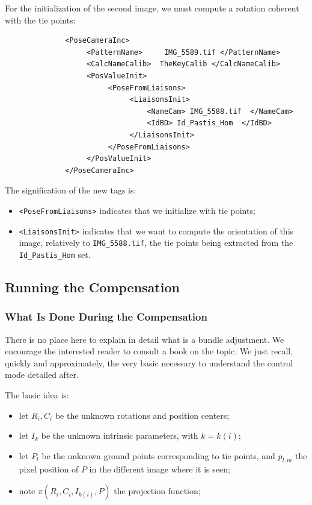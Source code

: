 For the initialization of the second image, we must compute
a rotation coherent with the tie points:


{\scriptsize
\begin{verbatim}
              <PoseCameraInc>
                   <PatternName>     IMG_5589.tif </PatternName>
                   <CalcNameCalib>  TheKeyCalib </CalcNameCalib>
                   <PosValueInit>
                        <PoseFromLiaisons>
                             <LiaisonsInit>
                                 <NameCam> IMG_5588.tif  </NameCam>
                                 <IdBD> Id_Pastis_Hom  </IdBD>
                             </LiaisonsInit>
                        </PoseFromLiaisons>
                   </PosValueInit>
              </PoseCameraInc>
\end{verbatim}
}

The signification of the new tags is:

\begin{itemize}
   \item {\tt <PoseFromLiaisons>} indicates that we initialize with tie points;
   \item {\tt <LiaisonsInit>} indicates that we want to compute the orientation
         of this image, relatively to {\tt IMG\_5588.tif}, the tie points
         being extracted from the {\tt Id\_Pastis\_Hom} set.
\end{itemize}


\subsection{Running the Compensation}

\subsubsection{What Is Done During the Compensation}

There is no place here to explain in detail what is a bundle adjustment.
We encourage  the interested  reader to consult a book
on the topic.  We just recall, quickly and approximately,
the very basic necessary to understand the control mode
detailed after.

The basic idea is:

\begin{itemize}
   \item let $R_i,C_i$  be the unknown  rotations and position centers;
   \item let  $I_k$ be the unknown intrinsic parameters, with $k=k(i)$;
   \item let  $P_l$ be the unknown ground points corresponding to tie points,
         and $p_{l,m}$ the pixel position of $P$ in the different image where
         it is seen;
   \item note $\pi(R_i,C_i,I_{k(i)},P)$   the projection function;
\end{itemize}

